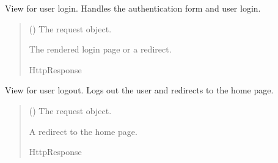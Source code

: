 \documentclass[letterpaper,10pt,english]{sphinxmanual}
\begin{document}
\begin{fulllineitems}
\label{\detokenize{modules/views:account.views.userlogin}}
\pysigstartsignatures
{}
\pysigstopsignatures
\sphinxAtStartPar
View for user login. Handles the authentication form and user login.
\begin{quote}\begin{description}
\sphinxAtStartPar
{} () \textendash{} The request object.

\sphinxAtStartPar
The rendered login page or a redirect.

\sphinxAtStartPar
HttpResponse

\end{description}\end{quote}

\end{fulllineitems}


\begin{fulllineitems}
\label{\detokenize{modules/views:account.views.userlogout}}
\pysigstartsignatures
{}
\pysigstopsignatures
\sphinxAtStartPar
View for user logout. Logs out the user and redirects to the home page.
\begin{quote}\begin{description}
\sphinxAtStartPar
{} () \textendash{} The request object.

\sphinxAtStartPar
A redirect to the home page.

\sphinxAtStartPar
HttpResponse

\end{description}\end{quote}

\end{fulllineitems}
\end{document}
